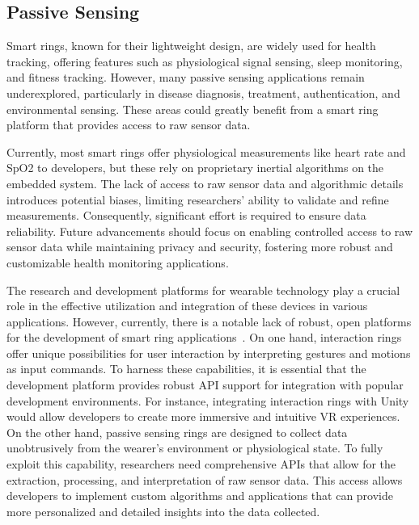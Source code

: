 
\subsection{Passive Sensing}
\label{sec:discuss_open_platform}
Smart rings, known for their lightweight design, are widely used for health tracking, offering features such as physiological signal sensing, sleep monitoring, and fitness tracking. However, many passive sensing applications remain underexplored, particularly in disease diagnosis, treatment, authentication, and environmental sensing. These areas could greatly benefit from a smart ring platform that provides access to raw sensor data.

Currently, most smart rings offer physiological measurements like heart rate and SpO2 to developers, but these rely on proprietary inertial algorithms on the embedded system. The lack of access to raw sensor data and algorithmic details introduces potential biases, limiting researchers' ability to validate and refine measurements. Consequently, significant effort is required to ensure data reliability. Future advancements should focus on enabling controlled access to raw sensor data while maintaining privacy and security, fostering more robust and customizable health monitoring applications.

The research and development platforms for wearable technology play a crucial role in the effective utilization and integration of these devices in various applications. However, currently, there is a notable lack of robust, open platforms for the development of smart ring applications~\cite{zhou2023one}. On one hand, interaction rings offer unique possibilities for user interaction by interpreting gestures and motions as input commands. To harness these capabilities, it is essential that the development platform provides robust API support for integration with popular development environments. For instance, integrating interaction rings with Unity would allow developers to create more immersive and intuitive VR experiences. On the other hand, passive sensing rings are designed to collect data unobtrusively from the wearer's environment or physiological state. To fully exploit this capability, researchers need comprehensive APIs that allow for the extraction, processing, and interpretation of raw sensor data. This access allows developers to implement custom algorithms and applications that can provide more personalized and detailed insights into the data collected.

